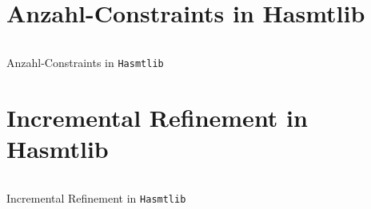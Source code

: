\section{Anzahl-Constraints in Hasmtlib}
\label{appendix:cardinalityimpl}
\begin{listing}[H]
        \inputminted[linenos=true]{haskell}{Code/Implementierung/Hasmtlib/Cardinality.hs}
        \caption{Anzahl-Constraints in \texttt{Hasmtlib} \cite{hasmtlibCardinality}}
        \label{listing:hasmtlibcardinality}
\end{listing}

\section{Incremental Refinement in Hasmtlib}
\label{appendix:incrementalrefinementimpl}
\begin{listing}[H]
        \inputminted[linenos=true]{haskell}{Code/Implementierung/Hasmtlib/IncrementalRefinement.hs}
        \caption{Incremental Refinement in \texttt{Hasmtlib} \cite{hasmtlibCardinality}}
        \label{listing:incrementalrefinement}
\end{listing}


